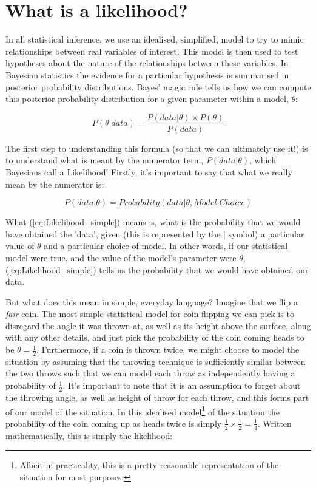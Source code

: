 \documentclass[11pt,fullpage]{book}
\begin{document}
\section{What is a likelihood?}
In all statistical inference, we use an idealised, simplified, model to try to mimic relationships between real variables of interest. This model is then used to test hypotheses about the nature of the relationships between these variables. In Bayesian statistics the evidence for a particular hypothesis is summarised in posterior probability distributions. Bayes' magic rule tells us how we can compute this posterior probability distribution for a given parameter within a model, $\theta$:

\begin{equation}
P(\theta|data) = \frac{P(data|\theta)\times P(\theta)}{P(data)}
\end{equation}\label{eq:Likelihood_Bayes}

The first step to understanding this formula (so that we can ultimately use it!) is to understand what is meant by the numerator term, $P(data|\theta)$, which Bayesians call a Likelihood! Firstly, it's important to say that what we really mean by the numerator is:

\begin{equation}
P(data|\theta) = Probability(data|\theta,Model \; Choice)
\end{equation}\label{eq:Likelihood_simple}

What (\ref{eq:Likelihood_simple}) means is, what is the probability that we would have obtained the 'data', given (this is represented by the $|$ symbol) a particular value of $\theta$ and a particular choice of model. In other words, if our statistical model were true, and the value of the model's parameter were $\theta$, (\ref{eq:Likelihood_simple}) tells us the probability that we would have obtained our data. 

But what does this mean in simple, everyday language? Imagine that we flip a \textit{fair} coin. The most simple statistical model for coin flipping we can pick is to disregard the angle it was thrown at, as well as its height above the surface, along with any other details, and just pick the probability of the coin coming heads to be $\theta=\frac{1}{2}$. Furthermore, if a coin is thrown twice, we might choose to model the situation by assuming that the throwing technique is sufficiently similar between the two throws such that we can model each throw as independently having a probability of $\frac{1}{2}$. It's important to note that it is an assumption to forget about the throwing angle, as well as height of throw for each throw, and this forms part of our model of the situation. In this idealised model\footnote{Albeit in practicality, this is a pretty reasonable representation of the situation for most purposes.} of the situation the probability of the coin coming up as heads twice is simply $\frac{1}{2}\times\frac{1}{2}=\frac{1}{4}$. Written mathematically, this is simply the likelihood:
\end{document}
